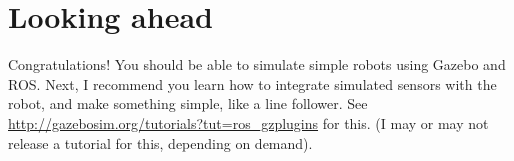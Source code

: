 \documentclass{article}
\begin{document}
        \section{Looking ahead}
        Congratulations! You should be able to simulate simple robots using Gazebo and 
        ROS. Next, I recommend you learn how to integrate simulated sensors with the robot, 
        and make something simple, like a line follower. See \url{http://gazebosim.org/tutorials?tut=ros_gzplugins}
        for this. (I may or may not release a tutorial for this, depending on demand).
\end{document}
